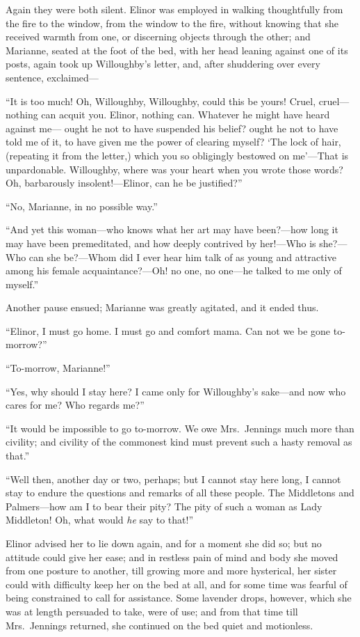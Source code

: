 \documentclass{article}
\begin{document}
Again they were both silent.  Elinor was employed
in walking thoughtfully from the fire to the window,
from the window to the fire, without knowing that she
received warmth from one, or discerning objects through
the other; and Marianne, seated at the foot of the bed,
with her head leaning against one of its posts,
again took up Willoughby's letter, and, after shuddering
over every sentence, exclaimed---%

``It is too much! Oh, Willoughby, Willoughby, could this
be yours!  Cruel, cruel---nothing can acquit you.  Elinor,
nothing can.  Whatever he might have heard against me---%
ought he not to have suspended his belief? ought he not to
have told me of it, to have given me the power of clearing
myself? `The lock of hair, (repeating it from the letter,)
which you so obligingly bestowed on me'---That is unpardonable.
Willoughby, where was your heart when you wrote those words?
Oh, barbarously insolent!---Elinor, can he be justified?''

``No, Marianne, in no possible way.''

``And yet this woman---who knows what her art may
have been?---how long it may have been premeditated,
and how deeply contrived by her!---Who is she?---Who can
she be?---Whom did I ever hear him talk of as young and
attractive among his female acquaintance?---Oh! no one,
no one---he talked to me only of myself.''

Another pause ensued; Marianne was greatly agitated,
and it ended thus.

``Elinor, I must go home.  I must go and comfort mama.
Can not we be gone to-morrow?''

``To-morrow, Marianne!''

``Yes, why should I stay here? I came only for
Willoughby's sake---and now who cares for me? Who regards me?''

``It would be impossible to go to-morrow. We owe
Mrs.\ Jennings much more than civility; and civility of
the commonest kind must prevent such a hasty removal as that.''

``Well then, another day or two, perhaps; but I cannot
stay here long, I cannot stay to endure the questions
and remarks of all these people.  The Middletons and
Palmers---how am I to bear their pity?  The pity of such
a woman as Lady Middleton!  Oh, what would \emph{he} say to that!''

Elinor advised her to lie down again, and for a
moment she did so; but no attitude could give her ease;
and in restless pain of mind and body she moved from one
posture to another, till growing more and more hysterical,
her sister could with difficulty keep her on the bed at all,
and for some time was fearful of being constrained to call
for assistance.  Some lavender drops, however, which she
was at length persuaded to take, were of use; and from
that time till Mrs.\ Jennings returned, she continued
on the bed quiet and motionless.
\end{document}
